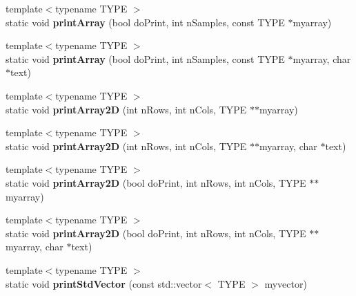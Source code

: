 \begin{DoxyCompactItemize}
\item 
\hypertarget{class_k_w_util_a551666cf04781258441f4d5a77c6a7d8}{{\footnotesize template$<$typename T\-Y\-P\-E $>$ }\\static void {\bfseries print\-Array} (bool do\-Print, int n\-Samples, const T\-Y\-P\-E $\ast$myarray)}\label{class_k_w_util_a551666cf04781258441f4d5a77c6a7d8}

\item 
\hypertarget{class_k_w_util_a5eafacfaa0ea74867d2b37cf22558644}{{\footnotesize template$<$typename T\-Y\-P\-E $>$ }\\static void {\bfseries print\-Array} (bool do\-Print, int n\-Samples, const T\-Y\-P\-E $\ast$myarray, char $\ast$text)}\label{class_k_w_util_a5eafacfaa0ea74867d2b37cf22558644}

\item 
\hypertarget{class_k_w_util_a0d00bcaaee4bf9fe1ea3f28c39db766d}{{\footnotesize template$<$typename T\-Y\-P\-E $>$ }\\static void {\bfseries print\-Array2\-D} (int n\-Rows, int n\-Cols, T\-Y\-P\-E $\ast$$\ast$myarray)}\label{class_k_w_util_a0d00bcaaee4bf9fe1ea3f28c39db766d}

\item 
\hypertarget{class_k_w_util_a8ca8f9d0826b637aee5285af196431a0}{{\footnotesize template$<$typename T\-Y\-P\-E $>$ }\\static void {\bfseries print\-Array2\-D} (int n\-Rows, int n\-Cols, T\-Y\-P\-E $\ast$$\ast$myarray, char $\ast$text)}\label{class_k_w_util_a8ca8f9d0826b637aee5285af196431a0}

\item 
\hypertarget{class_k_w_util_a2907060d81976090c40829107159666d}{{\footnotesize template$<$typename T\-Y\-P\-E $>$ }\\static void {\bfseries print\-Array2\-D} (bool do\-Print, int n\-Rows, int n\-Cols, T\-Y\-P\-E $\ast$$\ast$myarray)}\label{class_k_w_util_a2907060d81976090c40829107159666d}

\item 
\hypertarget{class_k_w_util_a59aabe5a32605da8367ca84c3ad3a0ab}{{\footnotesize template$<$typename T\-Y\-P\-E $>$ }\\static void {\bfseries print\-Array2\-D} (bool do\-Print, int n\-Rows, int n\-Cols, T\-Y\-P\-E $\ast$$\ast$myarray, char $\ast$text)}\label{class_k_w_util_a59aabe5a32605da8367ca84c3ad3a0ab}

\item 
\hypertarget{class_k_w_util_aaffd937290f71df67551a6f2a00e1660}{{\footnotesize template$<$typename T\-Y\-P\-E $>$ }\\static void {\bfseries print\-Std\-Vector} (const std\-::vector$<$ T\-Y\-P\-E $>$ myvector)}\label{class_k_w_util_aaffd937290f71df67551a6f2a00e1660}


\end{DoxyCompactItemize}
